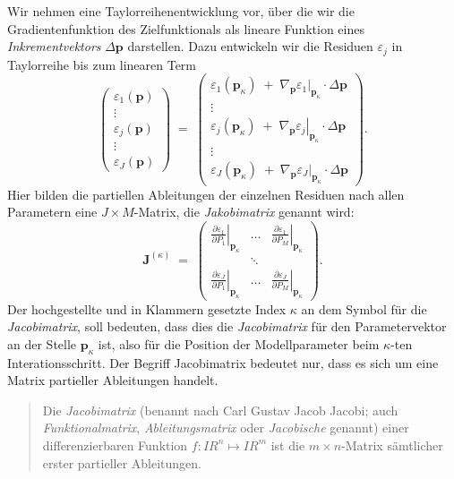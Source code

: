 Wir nehmen eine Taylorreihenentwicklung vor, über die wir die Gradientenfunktion des Zielfunktionals
als lineare Funktion eines \textsl{Inkrementvektors} $\Delta \mathbf{p}$ darstellen. Dazu entwickeln
wir die Residuen $\varepsilon_j$ in Taylorreihe bis zum linearen Term
\begin{equation}
\left(\begin{array}{c}
\varepsilon_1(\mathbf{p}) \\
\vdots \\
\varepsilon_j(\mathbf{p}) \\
\vdots \\
\varepsilon_J(\mathbf{p}) 
\end{array}\right)
\; = \; 
\left(\begin{array}{c}
\varepsilon_1(\mathbf{p}_\kappa) \; + \; \nabla_{\mathbf{p}} \left. \varepsilon_1 \right|_{\mathbf{p}_\kappa} \cdot \Delta \mathbf{p}\\
\vdots \\
\varepsilon_j(\mathbf{p}_\kappa) \; + \; \nabla_{\mathbf{p}} \left. \varepsilon_j \right|_{\mathbf{p}_\kappa} \cdot \Delta \mathbf{p}\\
\vdots \\
\varepsilon_J(\mathbf{p}_\kappa) \; + \; \nabla_{\mathbf{p}} \left. \varepsilon_J \right|_{\mathbf{p}_\kappa} \cdot \Delta \mathbf{p}
\end{array}\right).
\label{TaylorResi1}
\end{equation}
Hier bilden die partiellen Ableitungen der einzelnen Residuen nach allen Parametern eine $J \times M$-Matrix, die \textsl{Jakobimatrix}
genannt wird:
\begin{equation}
\boldsymbol{J}^{(\kappa)} \; = \; \left(\begin{array}{ccc}
\left. \frac{\partial \varepsilon_1}{\partial P_1} \right|_{\mathbf{p}_\kappa} & \dots & \left. \frac{\partial \varepsilon_1}{\partial P_M} \right|_{\mathbf{p}_\kappa} \\
 & \ddots & \\
\left. \frac{\partial \varepsilon_J}{\partial P_1}\right|_{\mathbf{p}_\kappa} & \dots & \left. \frac{\partial \varepsilon_J}{\partial P_M}\right|_{\mathbf{p}_\kappa}
\end{array}\right) .
\end{equation}
Der hochgestellte und in Klammern gesetzte Index $\kappa$ 
an dem Symbol für die \textsl{Jacobimatrix}, soll bedeuten,
dass dies die \textsl{Jacobimatrix} für den Parametervektor an der Stelle
$\mathbf{p}_\kappa$ ist, also für die Position der Modellparameter beim $\kappa$-ten Interationsschritt.
Der Begriff Jacobimatrix bedeutet nur, dass es
sich um eine Matrix partieller Ableitungen handelt.
\begin{quote}
Die \textsl{Jacobimatrix} (benannt nach Carl Gustav Jacob Jacobi; auch 
\textsl{Funktionalmatrix}, \textsl{Ableitungsmatrix} oder \textsl{Jacobische} genannt)
einer differenzierbaren Funktion
$f\colon I \! \! R^{n} \mapsto I \! \! R ^{m}$ ist die 
$m\times n$-Matrix sämtlicher erster partieller Ableitungen.
\end{quote}



